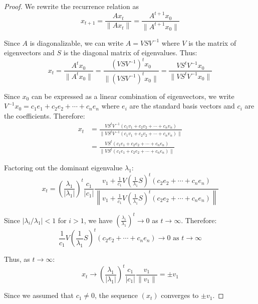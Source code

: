   \begin{proof}
    We rewrite the recurrence relation as 
    \begin{equation}
    x_{t+1} = \frac{Ax_t}{\|Ax_t\|} = \frac{A^{t+1}x_0}{\|A^{t+1}x_0\|}
    \end{equation}

    Since $A$ is diagonalizable, we can write $A = VSV^{-1}$ where $V$ is the matrix of eigenvectors and $S$ is the diagonal matrix of eigenvalues. Thus:
    \begin{equation}
    x_t = \frac{A^t x_0}{\|A^t x_0\|} = \frac{(VSV^{-1})^t x_0}{\|(VSV^{-1})^t x_0\|} = \frac{VS^t V^{-1} x_0}{\|VS^t V^{-1} x_0\|}
    \end{equation}

    Since $x_0$ can be expressed as a linear combination of eigenvectors, we write $V^{-1}x_0 = c_1 e_1 + c_2 e_2 + \cdots + c_n e_n$ where $e_i$ are the standard basis vectors and $c_i$ are the coefficients. Therefore:
    \begin{align}
      x_t & = \frac{VS^t V^{-1}(c_1 v_1 + c_2 v_2 + \cdots + c_n v_n)}{\|VS^t V^{-1}(c_1 v_1 + c_2 v_2 + \cdots + c_n v_n)\|} \\ 
          & = \frac{VS^t(c_1 e_1 + c_2 e_2 + \cdots + c_n e_n)}{\|VS^t(c_1 e_1 + c_2 e_2 + \cdots + c_n e_n)\|}
    \end{align}

    Factoring out the dominant eigenvalue $\lambda_1$:
    \begin{equation}
      x_t = \left(\frac{\lambda_1}{|\lambda_1|}\right)^t \frac{c_1}{|c_1|} \frac{v_1 + \frac{1}{c_1}V\left(\frac{1}{\lambda_1}S\right)^t(c_2 e_2 + \cdots + c_n e_n)}{\left\|v_1 + \frac{1}{c_1}V\left(\frac{1}{\lambda_1}S\right)^t(c_2 e_2 + \cdots + c_n e_n)\right\|}
    \end{equation}

    Since $|\lambda_i/\lambda_1| < 1$ for $i > 1$, we have $\left(\frac{\lambda_i}{\lambda_1}\right)^t \to 0$ as $t \to \infty$. Therefore:
    \begin{equation}
    \frac{1}{c_1}V\left(\frac{1}{\lambda_1}S\right)^t(c_2 e_2 + \cdots + c_n e_n) \to 0 \text{ as } t \to \infty
    \end{equation}

    Thus, as $t \to \infty$:
    \begin{equation}
    x_t \to \left(\frac{\lambda_1}{|\lambda_1|}\right)^t \frac{c_1}{|c_1|} \frac{v_1}{\|v_1\|} = \pm v_1
    \end{equation}

    Since we assumed that $c_1 \neq 0$, the sequence $(x_t)$ converges to $\pm v_1$. 
  \end{proof}

